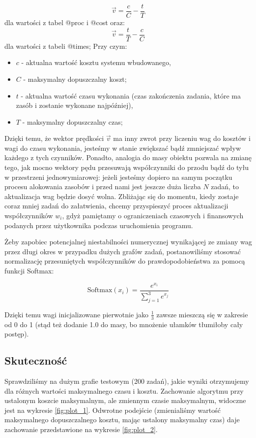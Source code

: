 \documentclass[a4paper,11pt]{article}
\begin{document}
\begin{equation*}
    \vec{v} = \frac{c}{C} - \frac{t}{T}
\end{equation*}
dla wartości z tabel @proc i @cost oraz:
\begin{equation*}
    \vec{v} = \frac{t}{T} - \frac{c}{C}
\end{equation*}
dla wartości z tabeli @times; Przy czym:
\begin{itemize}
    \item \(c\) - aktualna wartość kosztu systemu wbudowanego,
    \item \(C\) - maksymalny dopuszczalny koszt;
    \item \(t\) - aktualna wartość czasu wykonania (czas zakończenia zadania,
    które ma zasób i zostanie wykonane najpóźniej),
    \item \(T\) - maksymalny dopuszczalny czas;
\end{itemize}

Dzięki temu, że wektor prędkości \(\vec{v}\) ma inny zwrot przy liczeniu wag
do kosztów i wagi do czasu wykonania, jesteśmy w stanie zwiększać bądź zmniejszać
wpływ każdego z tych czynników. Ponadto, analogia do masy obiektu pozwala na
zmianę tego, jak mocno wektory pędu przesuwają współczynniki do przodu bądź do
tyłu w przestrzeni jednowymiarowej: jeżeli jesteśmy dopiero na samym początku 
procesu alokowania zasobów i przed nami jest jeszcze duża liczba \(N\) zadań, to
aktualizacja wag będzie dosyć wolna. Zbliżając się do momentu, kiedy zostaje
coraz mniej zadań do załatwienia, chcemy przyspieszyć proces aktualizacji 
współczynników \(w_i\), gdyż pamiętamy o ograniczeniach czasowych i finansowych
podanych przez użytkownika podczas uruchomienia programu.

Żeby zapobiec potencjalnej niestabilności numerycznej wynikającej ze zmiany
wag przez długi okres w przypadku dużych grafów zadań, postanowiliśmy
stosować normalizację przesuniętych współczynników do prawdopodobieństwa za
pomocą funkcji Softmax:

\begin{equation}
    \text{Softmax}(x_i) = \frac{e^{x_i}}{\sum_{j=1}^{3} e^{x_j}}
\end{equation}

Dzięki temu wagi inicjalizowane pierwotnie jako \(\frac{1}{3}\) zawsze 
mieszczą się w zakresie od 0 do 1 (stąd też dodanie 1.0 do masy, bo
mnożenie ułamków tłumiłoby cały postęp).

\subsection{Skuteczność}
Sprawdziliśmy na dużym grafie testowym (200 zadań), jakie wyniki otrzymujemy 
dla różnych wartości maksymalnego czasu i kosztu. Zachowanie algorytmu przy
ustalonym koszcie maksymalnym, ale zmiennym czasie maksymalnym, widoczne jest
na wykresie \ref{fig:plot_1}. Odwrotne podejście (zmienialiśmy wartość maksymalnego dopuszczalnego kosztu, mając ustalony maksymalny czas) daje zachowanie przedstawione na wykresie \ref{fig:plot_2}.
\end{document}
